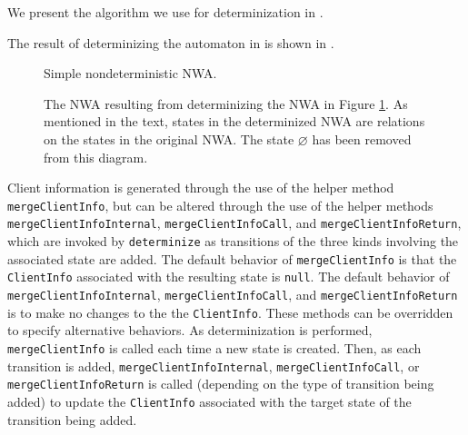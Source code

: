 We present the algorithm we use for determinization in
.



The result of determinizing the automaton in  is shown in
.

\begin{figure}[p]
  \centering
  \caption{Simple nondeterministic NWA.}
  \label{Fi:Det1}
\end{figure}


\begin{figure}[p]
  \centering
    \caption{The NWA resulting from determinizing the NWA in Figure
      \ref{Fi:Det1}. As mentioned in the text, states in the determinized NWA
      are relations on the states in the original NWA. The state
      $\varnothing$ has been removed from this diagram.} 
  \label{Fi:Det2}
\end{figure}


Client information is generated through the use of the helper method
\texttt{mergeClientInfo}, but can be altered through the use of the helper
methods \texttt{mergeClientInfoInternal}, \texttt{mergeClientInfoCall}, and
\texttt{mergeClientInfoReturn}, which are invoked by \texttt{determinize} as
transitions of the three kinds involving the associated state are added.  The
default behavior of \texttt{mergeClientInfo} is that the \texttt{ClientInfo}
associated with the resulting state is \texttt{null}.  The default behavior
of \texttt{mergeClientInfoInternal}, \texttt{mergeClientInfoCall}, and
\texttt{mergeClientInfoReturn} is to make no changes to the the
\texttt{ClientInfo}.  These methods can be overridden to specify alternative
behaviors.  As determinization is performed, \texttt{mergeClientInfo} is
called each time a new state is created.  Then, as each transition is added,
\texttt{mergeClientInfoInternal}, \texttt{mergeClientInfoCall}, or
\texttt{mergeClientInfoReturn} is called (depending on the type of transition
being added) to update the \texttt{ClientInfo} associated with the target
state of the transition being added.


